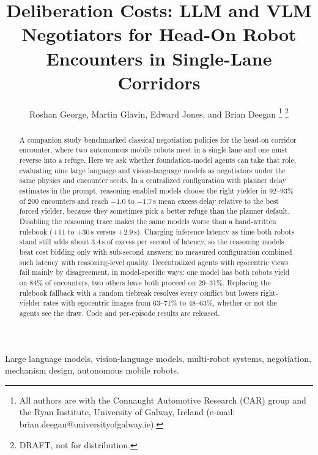 \documentclass[journal]{IEEEtran}
\begin{document}
\title{Deliberation Costs: LLM and VLM Negotiators for Head-On Robot Encounters in Single-Lane Corridors}
\author{Roshan George, Martin Glavin, Edward Jones, and Brian Deegan%
\thanks{All authors are with the Connaught Automotive Research (CAR) group and the Ryan Institute, University of Galway, Ireland (e-mail: brian.deegan@universityofgalway.ie).}%
\thanks{DRAFT, not for distribution.}}
\maketitle

\begin{abstract}
A companion study benchmarked classical negotiation policies for the head-on corridor encounter, where two autonomous mobile robots meet in a single lane and one must reverse into a refuge. Here we ask whether foundation-model agents can take that role, evaluating nine large language and vision-language models as negotiators under the same physics and encounter seeds. In a centralized configuration with planner delay estimates in the prompt, reasoning-enabled models choose the right yielder in 92--93\% of 200 encounters and reach $-1.0$ to $-1.7$\,s mean excess delay relative to the best forced yielder, because they sometimes pick a better refuge than the planner default. Disabling the reasoning trace makes the same models worse than a hand-written rulebook (+11 to +30\,s versus +2.9\,s). Charging inference latency as time both robots stand still adds about 3.4\,s of excess per second of latency, so the reasoning models beat cost bidding only with sub-second answers; no measured configuration combined such latency with reasoning-level quality. Decentralized agents with egocentric views fail mainly by disagreement, in model-specific ways: one model has both robots yield on 84\% of encounters, two others have both proceed on 29--31\%. Replacing the rulebook fallback with a random tiebreak resolves every conflict but lowers right-yielder rates with egocentric images from 63--71\% to 48--63\%, whether or not the agents see the draw. Code and per-episode results are released.
\end{abstract}

\begin{IEEEkeywords}
Large language models, vision-language models, multi-robot systems, negotiation,
mechanism design, autonomous mobile robots.
\end{IEEEkeywords}
\end{document}
